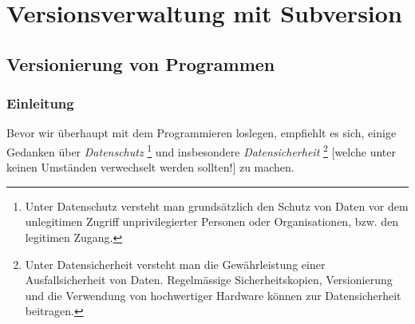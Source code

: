 \documentclass[b5paper,10pt,dvips,fleqn,titlepage,twoside]{book}
\begin{document}
\part{Versionsverwaltung mit Subversion}
\label{part:svn}
\chapter{Versionierung von Programmen}
\section{Einleitung}
Bevor wir überhaupt mit dem Programmieren loslegen, empfiehlt es sich, einige Gedanken über \emph{Datenschutz}
\footnote{Unter Datenschutz versteht man grundsätzlich den Schutz von Daten vor dem unlegitimen Zugriff unprivilegierter Personen oder Organisationen, bzw. den legitimen Zugang.} und insbesondere \emph{Datensicherheit}
\footnote{Unter Datensicherheit versteht man die Gewährleistung einer Ausfallsicherheit von Daten. Regelmässige Sicherheitskopien, Versionierung und die Verwendung von hochwertiger Hardware können zur Datensicherheit beitragen.} [welche unter keinen Umständen verwechselt werden sollten!] zu machen.
\end{document}
